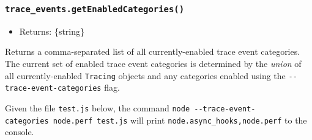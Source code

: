\subsubsection{\texorpdfstring{\texttt{trace\_events.getEnabledCategories()}}{trace\_events.getEnabledCategories()}}\label{trace_events.getenabledcategories}

\begin{itemize}
\tightlist
\item
  Returns: \{string\}
\end{itemize}

Returns a comma-separated list of all currently-enabled trace event
categories. The current set of enabled trace event categories is
determined by the \emph{union} of all currently-enabled \texttt{Tracing}
objects and any categories enabled using the
\texttt{-\/-trace-event-categories} flag.

Given the file \texttt{test.js} below, the command
\texttt{node\ -\/-trace-event-categories\ node.perf\ test.js} will print
\texttt{\textquotesingle{}node.async\_hooks,node.perf\textquotesingle{}}
to the console.

\begin{Shaded}
\begin{Highlighting}[]
\OperatorTok{=} \NormalTok{(}\NormalTok{)}\OperatorTok{;}
\OperatorTok{=}\NormalTok{(\{ }\OperatorTok{:}\NormalTok{ [}\NormalTok{] \})}\OperatorTok{;}
\OperatorTok{=}\NormalTok{(\{ }\OperatorTok{:}\NormalTok{ [}\NormalTok{] \})}\OperatorTok{;}
\OperatorTok{=}\NormalTok{(\{ }\OperatorTok{:}\NormalTok{ [}\NormalTok{] \})}\OperatorTok{;}

\NormalTok{()}\OperatorTok{;}
\NormalTok{()}\OperatorTok{;}

\NormalTok{())}\OperatorTok{;}
\end{Highlighting}
\end{Shaded}

